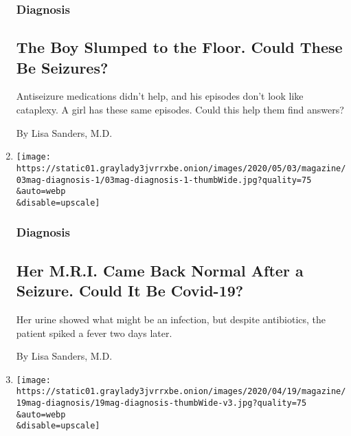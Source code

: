 \begin{enumerate}
  \hypertarget{diagnosis-6}{%
  \subsubsection{Diagnosis}\label{diagnosis-6}}

  \hypertarget{the-boy-slumped-to-the-floor-could-these-be-seizures}{%
  \subsection{The Boy Slumped to the Floor. Could These Be
  Seizures?}\label{the-boy-slumped-to-the-floor-could-these-be-seizures}}

  Antiseizure medications didn't help, and his episodes don't look like
  cataplexy. A girl has these same episodes. Could this help them find
  answers?

  By Lisa Sanders, M.D.
\item
  \href{/2020/04/30/magazine/she-had-a-seizure-but-her-mri-was-normal-could-it-be-covid-19-coronavirus.html}{}

  \texttt{[image: https://static01.graylady3jvrrxbe.onion/images/2020/05/03/magazine/03mag-diagnosis-1/03mag-diagnosis-1-thumbWide.jpg?quality=75\\\&auto=webp\\\&disable=upscale]}

  \hypertarget{diagnosis-7}{%
  \subsubsection{Diagnosis}\label{diagnosis-7}}

  \hypertarget{her-mri-came-back-normal-after-a-seizure-could-it-be-covid-19}{%
  \subsection{Her M.R.I. Came Back Normal After a Seizure. Could It Be
  Covid-19?}\label{her-mri-came-back-normal-after-a-seizure-could-it-be-covid-19}}

  Her urine showed what might be an infection, but despite antibiotics,
  the patient spiked a fever two days later.

  By Lisa Sanders, M.D.
\item
  \href{/2020/04/14/magazine/covid-symptoms-diagnosis.html}{}

  \texttt{[image: https://static01.graylady3jvrrxbe.onion/images/2020/04/19/magazine/19mag-diagnosis/19mag-diagnosis-thumbWide-v3.jpg?quality=75\\\&auto=webp\\\&disable=upscale]}

  \hypertarget{diagnosis-8}{%
}
\end{enumerate}
